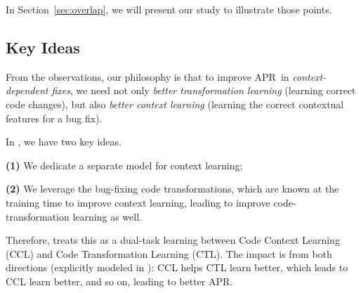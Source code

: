
%
In Section~\ref{sec:overlap}, we will present our study 
to illustrate those points.


\subsection{Key Ideas}
\label{sec:key-idea}


From the observations, our philosophy is that to improve APR~in {\em
  context-dependent fixes}, we need not only {\em better
  transformation learning} (learning correct code changes), but also
{\em better context learning} (learning the correct contextual
features for a bug fix).

In {\tool}, we have two key ideas.

{\bf (1)} We dedicate a separate model for context learning;

{\bf (2)} We leverage the bug-fixing code transformations, which
are known at the training time to improve context learning,
leading to improve code-transformation learning as well.

Therefore, {\tool} treats this as a dual-task learning between Code
Context Learning (CCL) and Code Transformation Learning (CTL). The
impact is from both directions (explicitly modeled in {\tool}): CCL
helps CTL learn better, which leads to CCL learn better, and so on,
leading to better APR.



